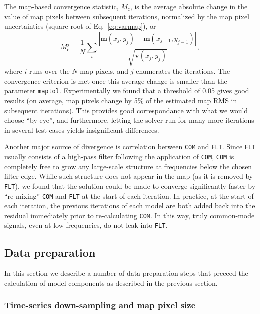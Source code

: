 \documentclass[useAMS,usenatbib,nofootinbib]{mn2e}
\newcommand{\model}[1]{\texttt{#1}}
\begin{document}
The map-based convergence statistic, $M_\mathrm{c}$, is the average
absolute change in the value of map pixels between subsequent
iterations, normalized by the map pixel uncertainties (square root of
Eq.~\ref{eq:varmap}), or
%
\begin{equation}
M^j_\mathrm{c} = \frac{1}{N} \sum_i \frac{| \mathbf{m}(x_j,y_j) -
  \mathbf{m}(x_{j-1},y_{j-1}) |} {\sqrt{\mathbf{v}(x_j,y_j)}} ,
\end{equation}
%
where $i$ runs over the $N$ map pixels, and $j$ enumerates the
iterations. The convergence criterion is met once this average change
is smaller than the parameter \texttt{maptol}. Experimentally we found
that a threshold of 0.05 gives good results (on average, map pixels
change by 5\% of the estimated map RMS in subsequent iterations).
This provides good correspondance with what we would choose ``by
eye'', and furthermore, letting the solver run for many more
iterations in several test cases yields insignificant differences.

Another major source of divergence is correlation between \model{COM}
and \model{FLT}. Since \model{FLT} usually consists of a high-pass
filter following the application of \model{COM}, \model{COM} is
completely free to grow any large-scale structure at frequencies below
the chosen filter edge. While such structure does not appear in the
map (as it is removed by \model{FLT}), we found that the solution
could be made to converge significantly faster by ``re-mixing''
\model{COM} and \model{FLT} at the start of each iteration. In
practice, at the start of each iteration, the previous iterations of
each model are both added back into the residual immediately prior to
re-calculating \model{COM}. In this way, truly common-mode signals,
even at low-frequencies, do not leak into \model{FLT}.

\subsection{Data preparation}

In this section we describe a number of data preparation steps that
preceed the calculation of model components as described in the
previous section.

\subsubsection{Time-series down-sampling and map pixel size}
\label{sec:downsamp}
\end{document}
